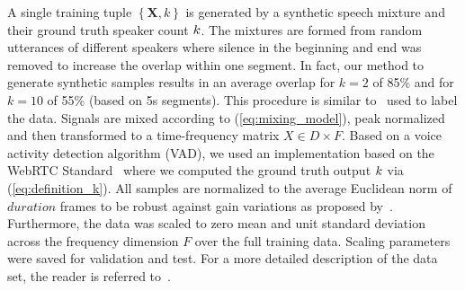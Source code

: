 \par
A single training tuple \( \left\{\mathbf{X}, k\right\} \) is generated by a synthetic speech mixture and their ground truth speaker count \(k \).
The mixtures are formed from random utterances of different speakers where silence in the beginning and end was removed to increase the overlap within one segment.
In fact, our method to generate synthetic samples results in an average overlap for \(k=2\) of 85\% and for \(k=10\) of 55\% (based on 5s segments).
This procedure is similar to~\cite{mesaros17} used to label the data.
Signals are mixed according to (\ref{eq:mixing_model}), peak normalized and then transformed to a time-frequency matrix \(X \in D \times F\).
Based on a voice activity detection algorithm (VAD), we used an implementation based on the WebRTC Standard~\cite{webrtc} where we computed the ground truth output \(k \) via (\ref{eq:definition_k}).
All samples are normalized to the average Euclidean norm of \(duration\) frames to be robust against gain variations as proposed by~\cite{uhlich15}.
Furthermore, the data was scaled to zero mean and unit standard deviation across the frequency dimension \(F\) over the full training data.
Scaling parameters were saved for validation and test.
For a more detailed description of the data set, the reader is referred to~\cite{stoeter17}.

%

